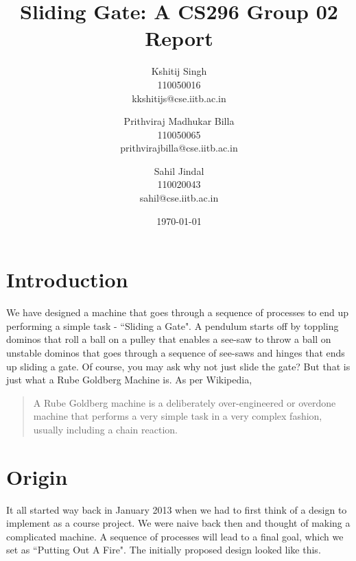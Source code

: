 \documentclass[a4paper,11pt]{article}
\begin{document}
\title{\textbf{Sliding Gate: A CS296 Group 02 Report}}

\author{
Kshitij Singh\\
110050016\\
kkshitijs@cse.iitb.ac.in
\and
Prithviraj Madhukar Billa\\
110050065\\
prithvirajbilla@cse.iitb.ac.in
\and
Sahil Jindal\\
110020043\\
sahil@cse.iitb.ac.in
}

\date{\today}
\maketitle

\setlength{\parindent}{0 cm}
\section{Introduction}

We have designed a machine that goes through a sequence of processes to end up performing a simple task - ``Sliding a Gate". A pendulum starts off by toppling dominos that roll a ball on a pulley that enables a see-saw to throw a ball on unstable dominos that goes through a sequence of see-saws and hinges that ends up sliding a gate. Of course, you may ask why not just slide the gate? But that is just what a Rube Goldberg Machine is. As per Wikipedia,

\begin{quote}
A Rube Goldberg machine is a deliberately over-engineered or overdone machine that performs a very simple task in a very complex fashion, usually including a chain reaction. 
\end{quote}

\section{Origin}

It all started way back in January 2013 when we had to first think of a design to implement as a course project. We were naive back then and thought of making a complicated machine. A sequence of processes will lead to a final goal, which we set as ``Putting Out A Fire". The initially proposed design looked like this.
\end{document}
